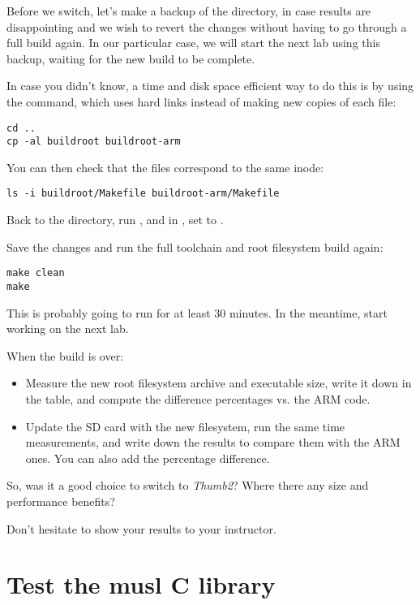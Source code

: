 Before we switch, let's make a backup of the  directory,
in case results are disappointing and we wish to revert the changes without
having to go through a full build again. In our particular case, we will
start the next lab using this backup, waiting for the new build to be
complete.

In case you didn't know, a time and disk space efficient way to do this is by using the
 command, which uses hard links instead of making new copies
of each file:

\begin{verbatim}
cd ..
cp -al buildroot buildroot-arm
\end{verbatim}

You can then check that the files correspond to the same inode:
\begin{verbatim}
ls -i buildroot/Makefile buildroot-arm/Makefile
\end{verbatim}

Back to the  directory, run , and
in , set  to
.

Save the changes and run the full toolchain and root filesystem build
again:

\begin{verbatim}
make clean
make
\end{verbatim}

This is probably going to run for at least 30 minutes. In the meantime,
start working on the next lab.

When the build is over:
\begin{itemize}
\item Measure the new root filesystem archive and 
executable size, write it down in the table, and compute the difference
percentages vs. the ARM code.
\item Update the SD card with the new filesystem, run the same time
measurements, and write down the results to compare them with the ARM
ones. You can also add the percentage difference.
\end{itemize}

So, was it a good choice to switch to {\em Thumb2}? Where there any size
and performance benefits?

Don't hesitate to show your results to your instructor.

\section{Test the musl C library}

